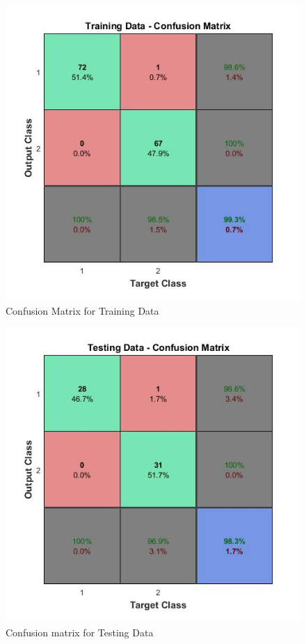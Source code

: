 \documentclass[10pt, letterpaper]{article}
\begin{document}
\begin{enumerate}
\begin{figure}[h!]
\centering
\includegraphics[scale=0.5]{TrainingData_Confusion.jpg}
\caption{Confusion Matrix for Training Data}
\label{Fig:ConfTraining}
\end{figure} 


\begin{figure}[h!]
\centering
\includegraphics[scale=0.5]{TestingData_Confusion.jpg}
\caption{Confusion matrix for Testing Data}
\label{Fig:ConfTesting}
\end{figure} 



\end{enumerate}
\end{document}
